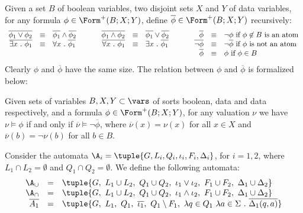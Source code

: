 Given a set $B$ of boolean variables, two disjoint sets $X$ and $Y$ of
data variables, for any formula $\phi \in \Form^+(B;X;Y)$,
define $\overline{\phi} \in \Form^+(B;X;Y)$ recursively:
\[\begin{array}{rclcrclcrcl}
\overline{\phi_1 \vee \phi_2} & \equiv & \overline{\phi_1} \wedge \overline{\phi_2} & \hspace*{5mm} & 
\overline{\phi_1 \wedge \phi_2} & \equiv & \overline{\phi_1} \vee \overline{\phi_2} & \hspace*{5mm} & 
\overline{\phi} & \equiv & \neg\phi \text{ if $\phi \not\in B$ is an atom} \\ 
\overline{\exists x ~.~ \phi_1} & \equiv & \forall x ~.~ \overline{\phi_1} && 
\overline{\forall x ~.~ \phi_1} & \equiv & \exists x ~.~ \overline{\phi_1} && 
\overline{\neg\phi} & \equiv & \neg \overline{\phi} \text{ if $\phi$ is not an atom} \\
&& && && && \overline{\phi} & \equiv & \phi \text{ if $\phi \in B$}
\end{array}\]
Clearly $\phi$ and $\overline{\phi}$ have the same size. The relation
between $\phi$ and $\overline{\phi}$ is formalized below:

\begin{proposition}\label{prop:complement}
  Given sets of variables $B,X,Y \subset \vars$ of sorts boolean, data
  and data respectively, and a formula $\phi \in
  \Form^+(B;X;Y)$, for any valuation $\nu$ we have $\nu \models
  \phi$ if and only if $\overline{\nu} \models \neg\overline{\phi}$,
  where $\overline{\nu}(x) = \nu(x)$ for all $x \in X$ and
  $\overline{\nu}(b) = \neg\nu(b)$ for all $b \in B$.
\end{proposition}

Consider the automata $\A_i = \tuple{G,L_i,Q_i,\iota_i,F_i,\Delta_i}$,
for $i=1,2$, where $L_1 \cap L_2 = \emptyset$ and $Q_1 \cap Q_2 =
\emptyset$. We define the following automata: 
\[\begin{array}{rcl}
\A_\cup & = & \tuple{G,~ L_1 \cup L_2,~ Q_1 \cup Q_2,~ \iota_1 \vee \iota_2,~ F_1 \cup F_2,~ \Delta_1 \cup \Delta_2} \\
\A_\cap & = & \tuple{G,~ L_1 \cup L_2,~ Q_1 \cup Q_2,~ \iota_1 \wedge \iota_2,~ F_1 \cup F_2,~ \Delta_1 \cup \Delta_2} \\
\overline{A_1} & = & \tuple{G,~ L_1,~ Q_1,~ \overline{\iota_1},~ Q_1 \setminus F_1,~ \lambda q \in Q_1~ \lambda a \in \Sigma ~.~ \overline{\Delta_1(q,a)}}
\end{array}\]

